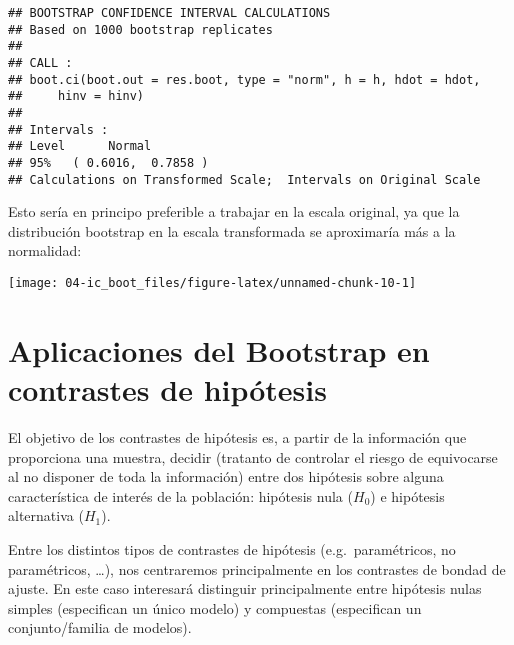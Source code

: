 \documentclass[
]{book}
\newenvironment{Shaded}{\begin{snugshade}}{\end{snugshade}}
\newcommand{\DataTypeTok}[1]{\textcolor[rgb]{0.13,0.29,0.53}{#1}}
\newcommand{\DecValTok}[1]{\textcolor[rgb]{0.00,0.00,0.81}{#1}}
\newcommand{\KeywordTok}[1]{\textcolor[rgb]{0.13,0.29,0.53}{\textbf{#1}}}
\newcommand{\NormalTok}[1]{#1}
\newcommand{\OperatorTok}[1]{\textcolor[rgb]{0.81,0.36,0.00}{\textbf{#1}}}
\newcommand{\OtherTok}[1]{\textcolor[rgb]{0.56,0.35,0.01}{#1}}
\newcommand{\StringTok}[1]{\textcolor[rgb]{0.31,0.60,0.02}{#1}}
\theoremstyle{break}
\theoremstyle{definition}
\theoremstyle{definition}
\theoremstyle{definition}
\theoremstyle{remark}
\begin{document}
\begin{verbatim}
## BOOTSTRAP CONFIDENCE INTERVAL CALCULATIONS
## Based on 1000 bootstrap replicates
## 
## CALL : 
## boot.ci(boot.out = res.boot, type = "norm", h = h, hdot = hdot, 
##     hinv = hinv)
## 
## Intervals : 
## Level      Normal        
## 95%   ( 0.6016,  0.7858 )  
## Calculations on Transformed Scale;  Intervals on Original Scale
\end{verbatim}

Esto sería en principo preferible a trabajar en la escala original, ya que la distribución bootstrap en la escala transformada se aproximaría más a la normalidad:

\begin{Shaded}
\end{Shaded}

\begin{center}\texttt{[image: 04-ic\_boot\_files/figure-latex/unnamed-chunk-10-1]} \end{center}

\hypertarget{contrastes}{%
\chapter{Aplicaciones del Bootstrap en contrastes de hipótesis}\label{contrastes}}

El objetivo de los contrastes de hipótesis es, a partir de la información
que proporciona una muestra, decidir (tratanto de controlar el riesgo de
equivocarse al no disponer de toda la información)
entre dos hipótesis sobre alguna característica de interés de la población:
hipótesis nula (\(H_{0}\)) e hipótesis alternativa (\(H_{1}\)).

Entre los distintos tipos de contrastes de hipótesis (e.g.~paramétricos,
no paramétricos, \ldots), nos centraremos principalmente en los contrastes
de bondad de ajuste. En este caso interesará distinguir principalmente
entre hipótesis nulas simples (especifican un único modelo) y compuestas
(especifican un conjunto/familia de modelos).
\end{document}
